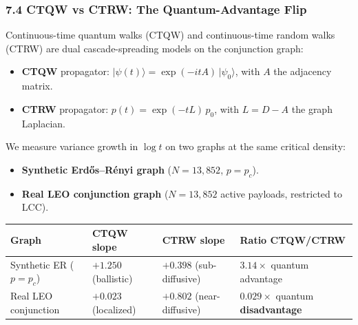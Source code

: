 \documentclass[
]{article}
\newcounter{none} %
\providecommand{\tightlist}{%
  \setlength{\itemsep}{0pt}\setlength{\parskip}{0pt}}
\begin{document}
\subsubsection{7.4 CTQW vs CTRW: The Quantum-Advantage
Flip}\label{ctqw-vs-ctrw-the-quantum-advantage-flip}

Continuous-time quantum walks (CTQW) and continuous-time random walks
(CTRW) are dual cascade-spreading models on the conjunction graph:

\begin{itemize}
\tightlist
\item
  \textbf{CTQW} propagator:
  \(|\psi(t)\rangle = \exp(-itA)\,|\psi_0\rangle\), with \(A\) the
  adjacency matrix.
\item
  \textbf{CTRW} propagator: \(p(t) = \exp(-tL)\, p_0\), with
  \(L = D - A\) the graph Laplacian.
\end{itemize}

We measure variance growth in \(\log t\) on two graphs at the same
critical density:

\begin{itemize}
\tightlist
\item
  \textbf{Synthetic Erdős--Rényi graph} (\(N = 13{,}852\), \(p = p_c\)).
\item
  \textbf{Real LEO conjunction graph} (\(N = 13{,}852\) active payloads,
  restricted to LCC).
\end{itemize}

{\def\LTcaptype{none} %
\begin{longtable}[]{@{}
  >{\raggedright\arraybackslash}p{}
  >{\raggedright\arraybackslash}p{}
  >{\raggedright\arraybackslash}p{}
  >{\raggedright\arraybackslash}p{}@{}}
\toprule\noalign{}
\begin{minipage}[b]{\linewidth}\raggedright
Graph
\end{minipage} & \begin{minipage}[b]{\linewidth}\raggedright
CTQW slope
\end{minipage} & \begin{minipage}[b]{\linewidth}\raggedright
CTRW slope
\end{minipage} & \begin{minipage}[b]{\linewidth}\raggedright
Ratio CTQW/CTRW
\end{minipage} \\
\midrule\noalign{}
\endhead
\bottomrule\noalign{}
\endlastfoot
Synthetic ER (\(p = p_c\)) & \(+1.250\) (ballistic) & \(+0.398\)
(sub-diffusive) & \(\mathbf{3.14\times}\) quantum advantage \\
Real LEO conjunction & \(+0.023\) (localized) & \(+0.802\)
(near-diffusive) & \(\mathbf{0.029\times}\) quantum
\textbf{disadvantage} \\
\end{longtable}
}
\end{document}
